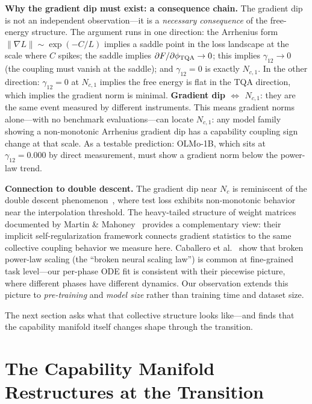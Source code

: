 \documentclass[11pt]{article}
\begin{document}
\textbf{Why the gradient dip must exist: a consequence chain.}
The gradient dip is not an independent observation---it is a \emph{necessary consequence} of the free-energy structure.
The argument runs in one direction: the Arrhenius form $\|\nabla L\|\sim\exp(-C/L)$ implies a saddle point in the loss landscape at the scale where $C$ spikes; the saddle implies $\partial F/\partial\phi_{\rm TQA}\to 0$; this implies $\gamma_{12}\to 0$ (the coupling must vanish at the saddle); and $\gamma_{12}=0$ is exactly $N_{c,1}$.
In the other direction: $\gamma_{12}=0$ at $N_{c,1}$ implies the free energy is flat in the TQA direction, which implies the gradient norm is minimal.
\textbf{Gradient dip $\Leftrightarrow$ $N_{c,1}$}: they are the same event measured by different instruments.
This means gradient norms alone---with no benchmark evaluations---can locate $N_{c,1}$: any model family showing a non-monotonic Arrhenius gradient dip has a capability coupling sign change at that scale.
As a testable prediction: OLMo-1B, which sits at $\gamma_{12}=0.000$ by direct measurement, must show a gradient norm below the power-law trend.

\textbf{Connection to double descent.}
The gradient dip near $N_c$ is reminiscent of the double descent phenomenon~\cite{nakkiran2020},
where test loss exhibits non-monotonic behavior near the interpolation threshold.
The heavy-tailed structure of weight matrices documented by Martin \& Mahoney~\cite{martin2021} provides a complementary view: their implicit self-regularization framework connects gradient statistics to the same collective coupling behavior we measure here.
Caballero et al.~\cite{caballero2022} show that broken power-law scaling (the ``broken neural scaling law'') is common at fine-grained task level---our per-phase ODE fit is consistent with their piecewise picture, where different phases have different dynamics.
Our observation extends this picture to \emph{pre-training} and \emph{model size}
rather than training time and dataset size.

The next section asks what that collective structure looks like---and finds that the capability manifold itself changes shape through the transition.

\section{The Capability Manifold Restructures at the Transition}
\label{sec:topology}
\end{document}
